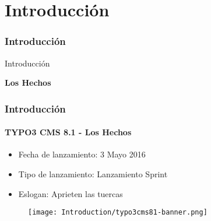 %

\section{Introducción}
\begin{frame}[fragile]
	\frametitle{Introducción}

	\begin{center}\huge{Introducción}\end{center}
	\begin{center}\huge{\color{typo3darkgrey}\textbf{Los Hechos}}\end{center}

\end{frame}

\begin{frame}[fragile]
	\frametitle{Introducción}
	\framesubtitle{TYPO3 CMS 8.1 - Los Hechos}

	\begin{itemize}
		\item Fecha de lanzamiento: 3 Mayo 2016
		\item Tipo de lanzamiento: Lanzamiento Sprint
		\item Eslogan: Aprieten las tuercas
	\end{itemize}

	\begin{figure}
		\texttt{[image: Introduction/typo3cms81-banner.png]}
	\end{figure}

\end{frame}


